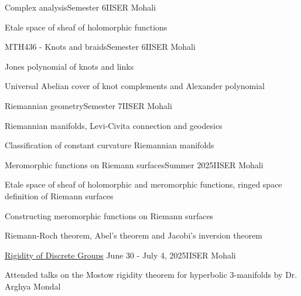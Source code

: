 \documentclass{LoLaTeXcv}
\begin{document}
\begin{lltxJob}{Complex analysis}{Semester 6}{IISER Mohali}
	\item Etale space of sheaf of holomorphic functions	
\end{lltxJob}

\begin{lltxJob}{MTH436 - Knots and braids}{Semester 6}{IISER Mohali}
	\item Jones polynomial of knots and links
	\item Universal Abelian cover of knot complements and Alexander polynomial
\end{lltxJob}

\begin{lltxJob}{Riemannian geometry}{Semester 7}{IISER Mohali}
	\item Riemannian manifolds, Levi-Civita connection and geodesics
	\item Classification of constant curvature Riemannian manifolds
\end{lltxJob}


\begin{lltxJob}{Meromorphic functions on Riemann surfaces}{Summer 2025}{IISER Mohali}
	\item Etale space of sheaf of holomorphic and meromorphic functions, ringed space definition of Riemann surfaces
	\item Constructing meromorphic functions on Riemann surfaces
	\item Riemann-Roch theorem, Abel's theorem and Jacobi's inversion theorem
\end{lltxJob}

\begin{lltxJob}{
	\href{https://docs.google.com/document/d/18rjLGn7hJHEmRk-QYcSysw5hH7nbYy5A}{Rigidity of Discrete Groups}
	}{June 30 - July 4, 2025}{IISER Mohali}
	\item Attended talks on the Mostow rigidity theorem for hyperbolic 3-manifolds by Dr. Arghya Mondal
\end{lltxJob}
\end{document}
